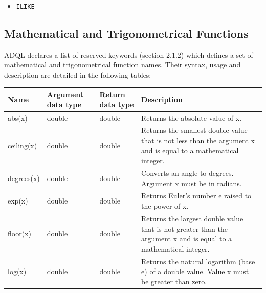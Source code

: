 \documentclass[11pt,a4paper]{ivoa}
\begin{document}
\begin{itemize}
    \item \verb:ILIKE:
\end{itemize}

\clearpage
\subsection{Mathematical and Trigonometrical Functions}
\label{sec:math.functions}

ADQL declares a list of reserved keywords (section 2.1.2) which defines
a set of mathematical and trigonometrical function names. Their syntax,
usage and description are detailed in the following tables:

\begin{table}[thm]\footnotesize
    \begin{tabular}{|p{}|p{}|p{}|p{}|}
        \hline

        \hline
        \textbf{Name} &
        \textbf{Argument \newline data type} &
        \textbf{Return \newline data type} &
        \textbf{Description}
        \tabularnewline

        \hline
        abs(x) &
        double&double &
        Returns the absolute value of x.
        \tabularnewline

        \hline
        ceiling(x) &
        double&double &
        Returns the smallest double value that is not less than the argument x and is equal to a mathematical integer.
        \tabularnewline

        \hline
        degrees(x) &
        double &
        double &
        Converts an angle to degrees. Argument x must be in radians.
        \tabularnewline

        \hline
        exp(x) &
        double &
        double &
        Returns Euler’s number e raised to the power of x.
        \tabularnewline

        \hline
        floor(x) &
        double &
        double &
        Returns the largest double value that is not greater than the argument x and is equal to a mathematical integer.
        \tabularnewline

        \hline
        log(x) &
        double &
        double &
        Returns the natural logarithm (base e) of a double value. Value x must be greater than zero.
        \tabularnewline


\end{tabular}
\end{table}
\end{document}
